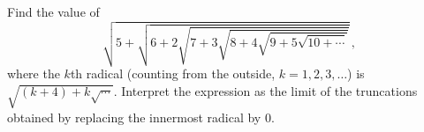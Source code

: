 Find the value of
\[
\sqrt{5+\sqrt{6+2\sqrt{7+3\sqrt{8+4\sqrt{9+5\sqrt{10+\cdots}}}}}}\,,
\]
where the $k$th radical (counting from the outside, $k=1,2,3,\dots$) is $\sqrt{(k+4)+k\sqrt{\cdots}}$. Interpret the expression as the limit of the truncations obtained by replacing the innermost radical by $0$.

